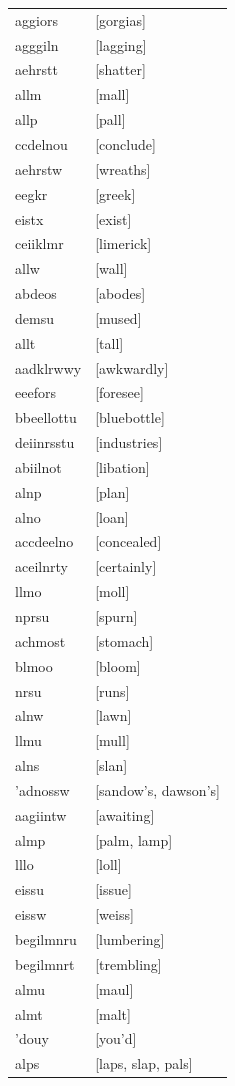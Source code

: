 \documentclass{article}
\begin{document}
\begin{tabular}{ll}
aggiors & [gorgias] \\
agggiln & [lagging] \\
aehrstt & [shatter] \\
allm & [mall] \\
allp & [pall] \\
ccdelnou & [conclude] \\
aehrstw & [wreaths] \\
eegkr & [greek] \\
eistx & [exist] \\
ceiiklmr & [limerick] \\
allw & [wall] \\
abdeos & [abodes] \\
demsu & [mused] \\
allt & [tall] \\
aadklrwwy & [awkwardly] \\
eeefors & [foresee] \\
bbeellottu & [bluebottle] \\
deiinrsstu & [industries] \\
abiilnot & [libation] \\
alnp & [plan] \\
alno & [loan] \\
accdeelno & [concealed] \\
aceilnrty & [certainly] \\
llmo & [moll] \\
nprsu & [spurn] \\
achmost & [stomach] \\
blmoo & [bloom] \\
nrsu & [runs] \\
alnw & [lawn] \\
llmu & [mull] \\
alns & [slan] \\
'adnossw & [sandow's, dawson's] \\
aagiintw & [awaiting] \\
almp & [palm, lamp] \\
lllo & [loll] \\
eissu & [issue] \\
eissw & [weiss] \\
begilmnru & [lumbering] \\
begilmnrt & [trembling] \\
almu & [maul] \\
almt & [malt] \\
'douy & [you'd] \\
alps & [laps, slap, pals] \\

\end{tabular}
\end{document}
